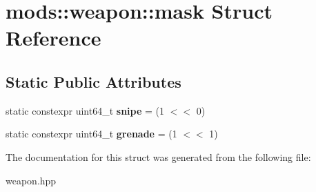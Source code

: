 \hypertarget{structmods_1_1weapon_1_1mask}{}\section{mods\+:\+:weapon\+:\+:mask Struct Reference}
\label{structmods_1_1weapon_1_1mask}
\subsection*{Static Public Attributes}
\begin{DoxyCompactItemize}
\item 
\mbox{\label{structmods_1_1weapon_1_1mask_ad1c95bb627d3f8c83b1c04e4925ee07f}} 
static constexpr uint64\+\_\+t {\bfseries snipe} = (1 $<$$<$ 0)
\item 
\mbox{\label{structmods_1_1weapon_1_1mask_a9315f413d3e851898e9d8cc70bee4730}} 
static constexpr uint64\+\_\+t {\bfseries grenade} = (1 $<$$<$ 1)
\end{DoxyCompactItemize}


The documentation for this struct was generated from the following file\+:\begin{DoxyCompactItemize}
\item 
weapon.\+hpp\end{DoxyCompactItemize}
